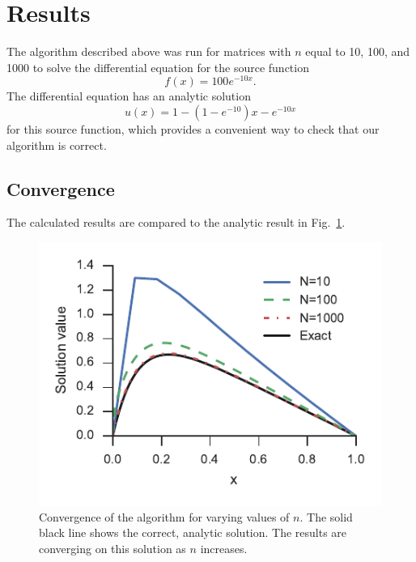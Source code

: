 \documentclass{article}
\begin{document}
    \section{Results}

        The algorithm described above was run for matrices with $n$ equal to 10, 100, and 1000 to   solve the differential equation for the source function
        \begin{equation}
            f(x) = 100 e^{-10x}.
        \end{equation}
        The differential equation has an analytic solution
        \begin{equation}
            u(x) = 1 - (1 - e^{-10}) x - e^{-10x}
        \end{equation}
        for this source function, which provides a convenient way to check that our algorithm is correct.

        \subsection{Convergence}

            The calculated results are compared to the analytic result in Fig.~\ref{fig:convergence}.

            \begin{figure}
                \centering
                \includegraphics{convergence.pdf}
                \caption{Convergence of the algorithm for varying values of $n$. The solid black line shows the correct, analytic solution. The results are converging on this solution as $n$ increases.}
                \label{fig:convergence}
            \end{figure}
\end{document}
